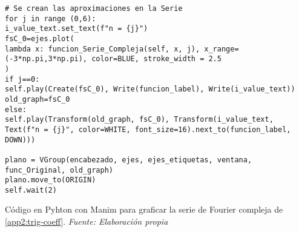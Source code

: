\begin{longlisting}
\begin{verbatim}
# Se crean las aproximaciones en la Serie
for j in range (0,6):
i_value_text.set_text(f"n = {j}")
fsC_0=ejes.plot(
lambda x: funcion_Serie_Compleja(self, x, j), x_range=(-3*np.pi,3*np.pi), color=BLUE, stroke_width = 2.5
)
if j==0:
self.play(Create(fsC_0), Write(funcion_label), Write(i_value_text))
old_graph=fsC_0
else:
self.play(Transform(old_graph, fsC_0), Transform(i_value_text, Text(f"n = {j}", color=WHITE, font_size=16).next_to(funcion_label, DOWN)))

plano = VGroup(encabezado, ejes, ejes_etiquetas, ventana, func_Original, old_graph)
plano.move_to(ORIGIN)
self.wait(2)
	\end{verbatim}
	\caption[Código en Pyhton con Manim para graficar la serie de Fourier compleja de \ref{app2:trig-coeff}.] {Código en Pyhton con Manim para graficar la serie de Fourier compleja de \ref{app2:trig-coeff}. \textit{Fuente: Elaboración propia}} 
\end{longlisting}


